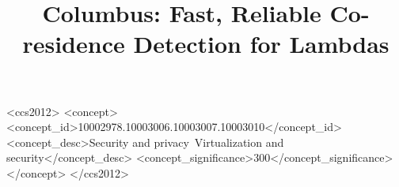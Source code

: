 \documentclass[sigconf,review]{acmart}
\begin{document}
\title[Columbus: Fast, Reliable Co-residence Detection for Lambdas]
{Columbus: Fast, Reliable Co-residence Detection for Lambdas} %







\begin{CCSXML}
<ccs2012>
<concept>
<concept_id>10002978.10003006.10003007.10003010</concept_id>
<concept_desc>Security and privacy~Virtualization and security</concept_desc>
<concept_significance>300</concept_significance>
</concept>
</ccs2012>
\end{CCSXML}




\end{document}
